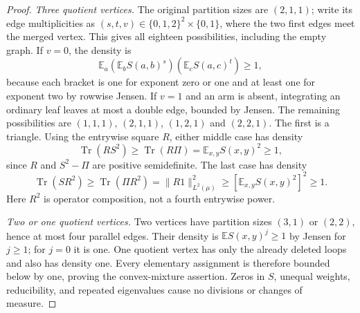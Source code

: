 \documentclass[a4paper,11pt,reqno]{amsart}
\theoremstyle{plain}
\theoremstyle{definition}
\theoremstyle{remark}
\begin{document}
\begin{proof}
\smallskip\noindent\emph{Three quotient vertices.}
The original partition sizes are $(2,1,1)$; write its edge multiplicities
as $(s,t,v)\in\{0,1,2\}^2\times\{0,1\}$, where the two first edges
meet the merged vertex.  This gives all eighteen possibilities, including
the empty graph.  If $v=0$, the density is
\[
 \mathbb E_a\left(\mathbb E_bS(a,b)^s\right)
              \left(\mathbb E_cS(a,c)^t\right)\ge1,
\]
because each bracket is one for exponent zero or one and at least one
for exponent two by rowwise Jensen.  If $v=1$ and an arm is absent,
integrating an ordinary leaf leaves at most a double edge, bounded by
Jensen.  The remaining possibilities are $(1,1,1)$, $(2,1,1)$,
$(1,2,1)$ and $(2,2,1)$.  The first is a triangle.  Using the entrywise
square $R$, either middle case has density
\[
 \operatorname{Tr}(RS^2)\ge\operatorname{Tr}(R\Pi)
       =\mathbb E_{x,y}S(x,y)^2\ge1,
\]
since $R$ and $S^2-\Pi$ are positive semidefinite.  The last case has
density
\[
 \operatorname{Tr}(SR^2)\ge\operatorname{Tr}(\Pi R^2)
       =\|R1\|_{L^2(\mu)}^2
       \ge[\mathbb E_{x,y}S(x,y)^2]^2\ge1.
\]
Here $R^2$ is operator composition, not a fourth entrywise power.

\smallskip\noindent\emph{Two or one quotient vertices.}
Two vertices have partition sizes $(3,1)$ or $(2,2)$, hence at most four
parallel edges.  Their density is $\mathbb E S(x,y)^j\ge1$ by Jensen
for $j\ge1$; for $j=0$ it is one.  One quotient vertex has only the
already deleted loops and also has density one.
Every elementary assignment is therefore bounded below by one, proving
the convex-mixture assertion.  Zeros in $S$, unequal weights, reducibility,
and repeated eigenvalues cause no divisions or changes of measure.
\end{proof}
\end{document}
